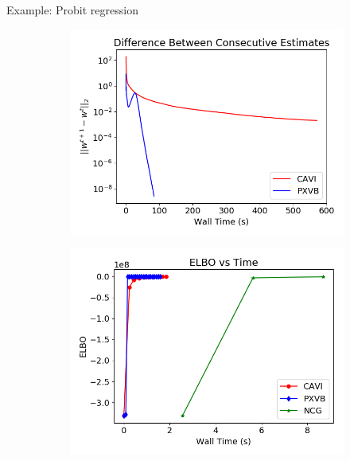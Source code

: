 \documentclass[final]{beamer}
\newlength{\twocolwid}
\begin{document}
\begin{frame}[t]
\begin{columns}[t]
\begin{column}{\twocolwid}
\begin{block}{Example: Probit regression}

\begin{figure}[h]
        \begin{subfigure}[t]{0.49\textwidth}
        \includegraphics[width=\textwidth]{Probit_real/CAVI_PX_convergence.png}
    \end{subfigure}
          \begin{subfigure}[t]{0.49\textwidth}
        \includegraphics[width=\textwidth]{Probit_real/elbo_time.png}

\end{subfigure}
\end{figure}
\end{block}
\end{column}
\end{columns}
\end{frame}
\end{document}
